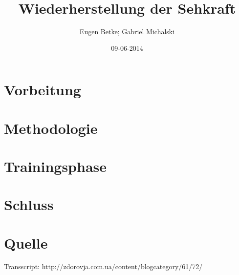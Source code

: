 \documentclass[a4paper,10pt,twoside,notitlepage,twocolumn]{article}
\author{Eugen Betke; Gabriel Michalski}
\title{Wiederherstellung der Sehkraft}
\date{09-06-2014}
\begin{document}
\maketitle

\section{Vorbeitung}
\section{Methodologie}
\section{Trainingsphase}
\section{Schluss}
\section{Quelle}
Transscript: http://zdorovja.com.ua/content/blogcategory/61/72/	
\end{document}
